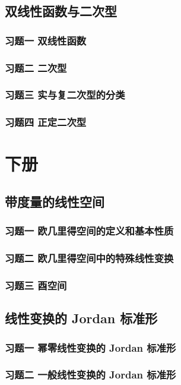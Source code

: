\documentclass[11pt,a4paper,openany,oneside]{book}
\begin{document}
\chapter{双线性函数与二次型}
\section{习题一 \quad 双线性函数}	
\section{习题二 \quad 二次型}
\section{习题三 \quad 实与复二次型的分类}
\section{习题四 \quad 正定二次型}


\part{下册}

\chapter{带度量的线性空间}
\section{习题一 \quad 欧几里得空间的定义和基本性质}	
\section{习题二 \quad 欧几里得空间中的特殊线性变换}
\section{习题三 \quad 酉空间}

\chapter{线性变换的 Jordan 标准形}
\section{习题一 \quad 幂零线性变换的 Jordan 标准形}	
\section{习题二 \quad 一般线性变换的 Jordan 标准形}
\end{document}
